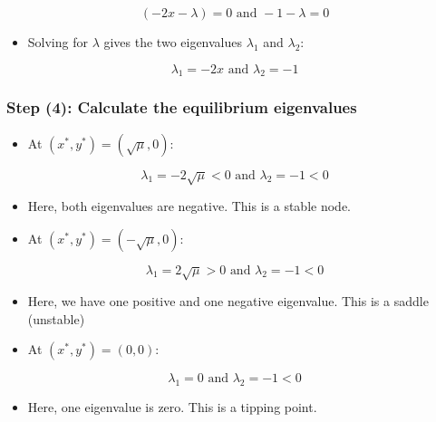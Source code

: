 \documentclass[
]{article}
\providecommand{\tightlist}{%
  \setlength{\itemsep}{0pt}\setlength{\parskip}{0pt}}
\begin{document}
\[(-2x-\lambda) = 0 \text{ and } -1-\lambda = 0\]

\begin{itemize}
\tightlist
\item
  Solving for \(\lambda\) gives the two eigenvalues \(\lambda_1\) and
  \(\lambda_2\):
\end{itemize}

\[\lambda_1 = -2x \text{ and }\lambda_2 = -1\]

\hypertarget{step-4-calculate-the-equilibrium-eigenvalues}{%
\subsubsection{Step (4): Calculate the equilibrium
eigenvalues}\label{step-4-calculate-the-equilibrium-eigenvalues}}

\begin{itemize}
\tightlist
\item
  At \((x^*, y^*) = (\sqrt{\mu}, 0)\):
\end{itemize}

\[\lambda_1 = -2\sqrt{\mu}<0 \text{ and }\lambda_2 = -1 < 0\]

\begin{itemize}
\item
  Here, both eigenvalues are negative. This is a stable node.
\item
  At \((x^*, y^*) = (-\sqrt{\mu}, 0)\):
\end{itemize}

\[\lambda_1 = 2\sqrt{\mu} > 0 \text{ and }\lambda_2 = -1 < 0\]

\begin{itemize}
\item
  Here, we have one positive and one negative eigenvalue. This is a
  saddle (unstable)
\item
  At \((x^*, y^*) = (0, 0)\):
\end{itemize}

\[\lambda_1 = 0 \text{ and }\lambda_2 = -1 < 0\]

\begin{itemize}
\tightlist
\item
  Here, one eigenvalue is zero. This is a tipping point.
\end{itemize}
\end{document}
